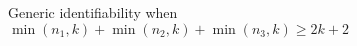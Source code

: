 \documentclass[preview]{standalone}
\begin{document}
\begin{center}
Generic identifiability when $\min(n_1, k) + \min(n_2, k) + \min(n_3, k) \geq 2k + 2$
\end{center}
\end{document}
